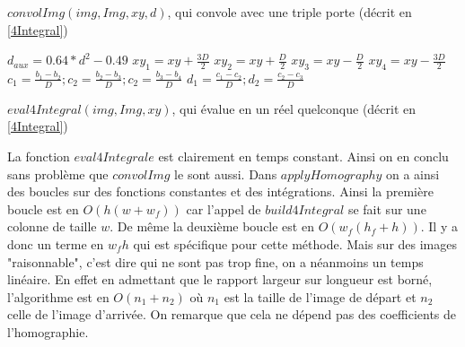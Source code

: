  
 
 
  \begin{algorithm}[H]
 \caption{$convolImg(img,Img,xy,d)$, qui convole avec une triple porte (décrit en \ref{4Integral})}
 $d_{aux} = 0.64 * d^{2} - 0.49$\;
 $xy_{1}  = xy + \frac{3D}{2}$\; 
 $xy_{2}  = xy + \frac{D}{2}$\; 
 $xy_{3}  = xy - \frac{D}{2}$\; 
 $xy_{4}  = xy - \frac{3D}{2}$\;
 $c_1 = \frac{b_1 - b_2}{D}; c_2=\frac{b_2 - b_3}{D}; c_2=\frac{b_3 - b_4}{D}$\; 
 $d_1 = \frac{c_1 - c_2}{D}; d_2=\frac{c_2 - c_3}{D}$\; 
 \end{algorithm}
 
 
 
  \begin{algorithm}[H]
 \caption{$eval4Integral(img,Img,xy)$, qui évalue en un réel quelconque (décrit en \ref{4Integral})}
 \end{algorithm}






La fonction $eval4Integrale$ est clairement en temps constant. Ainsi on en conclu sans problème que $convolImg$ le sont aussi. Dans $applyHomography$ on a ainsi des boucles sur des fonctions constantes et des intégrations. Ainsi la première boucle est en $O(h(w+w_f))$ car l'appel de $build4Integral$ se fait sur une colonne de taille $w$. De même la deuxième boucle est en $O(w_f(h_f+h))$. Il y a donc un terme en $w_f h$ qui est spécifique pour cette méthode. Mais sur des images "raisonnable", c'est dire qui ne sont pas trop fine, on a néanmoins un temps linéaire.
\medbreak
En effet en admettant que le rapport largeur sur longueur est borné, l'algorithme est en $O(n_1+n_2)$ où $n_1$ est la taille de l'image de départ et $n_2$ celle de l'image d'arrivée. On remarque que cela ne dépend pas des coefficients de l'homographie.



